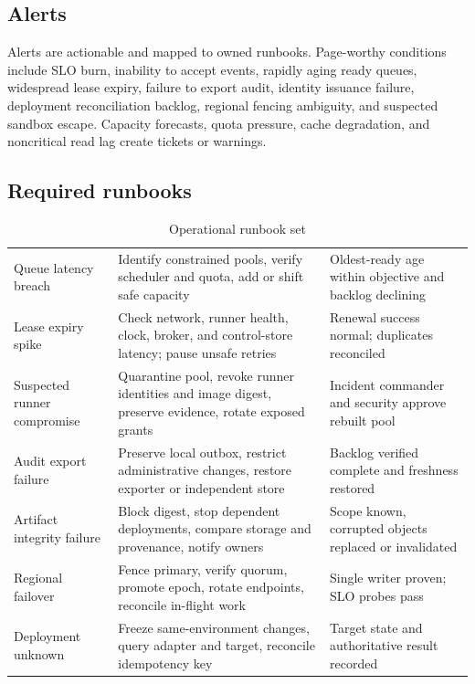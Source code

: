 \subsection{Alerts}

Alerts are actionable and mapped to owned runbooks. Page-worthy conditions include
SLO burn, inability to accept events, rapidly aging ready queues, widespread lease
expiry, failure to export audit, identity issuance failure, deployment reconciliation
backlog, regional fencing ambiguity, and suspected sandbox escape. Capacity forecasts,
quota pressure, cache degradation, and noncritical read lag create tickets or warnings.

\subsection{Required runbooks}

\begin{table}[htbp]
\centering
\caption{Operational runbook set}
\label{tab:runbooks}
\begin{tabularx}{\textwidth}{@{}L{0.28\textwidth}Y Y@{}}
  \toprule
   &  &  \\
  \midrule
  Queue latency breach & Identify constrained pools, verify scheduler and quota, add or shift safe capacity & Oldest-ready age within objective and backlog declining \\
  Lease expiry spike & Check network, runner health, clock, broker, and control-store latency; pause unsafe retries & Renewal success normal; duplicates reconciled \\
  Suspected runner compromise & Quarantine pool, revoke runner identities and image digest, preserve evidence, rotate exposed grants & Incident commander and security approve rebuilt pool \\
  Audit export failure & Preserve local outbox, restrict administrative changes, restore exporter or independent store & Backlog verified complete and freshness restored \\
  Artifact integrity failure & Block digest, stop dependent deployments, compare storage and provenance, notify owners & Scope known, corrupted objects replaced or invalidated \\
  Regional failover & Fence primary, verify quorum, promote epoch, rotate endpoints, reconcile in-flight work & Single writer proven; SLO probes pass \\
  Deployment unknown & Freeze same-environment changes, query adapter and target, reconcile idempotency key & Target state and authoritative result recorded \\
  \bottomrule
\end{tabularx}
\end{table}

